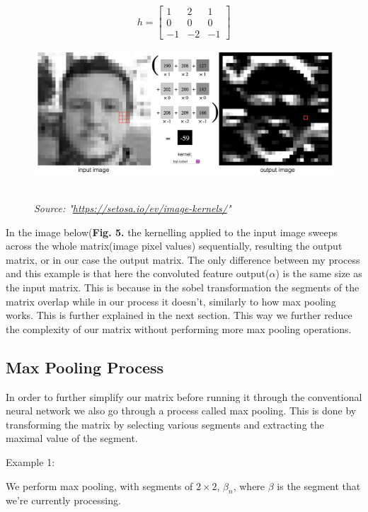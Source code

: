 \documentclass[9pt,onecolumn,oneside]{osajnl}
\begin{document}
    \[h =\begin{bmatrix}
1 & 2 & 1\\
0 & 0 & 0 \\
-1 & -2 & -1
\end{bmatrix} \]
\begin{figure}[h]
  \centering
  \begin{minipage}[b]{0.9\textwidth}
    \includegraphics[width=\textwidth]{sobel.png}
  \end{minipage}
  \\
  \textit{Source: "\url{https://setosa.io/ev/image-kernels/}"}
\end{figure}

	In the image below(\textbf{Fig. 5.} the kernelling applied to the input image sweeps across the whole matrix(image pixel values) sequentially, resulting the output matrix, or in our case the output matrix. The only difference between my process and this example is that here the convoluted feature output(\(\alpha\)) is the same size as the input matrix. This is because in the sobel transformation the segments of the matrix overlap while in our process it doesn't, similarly to how max pooling works. This is further explained in the next section. This way we further reduce the complexity of our matrix without performing more max pooling operations. 
  

\subsection{Max Pooling Process}

	In order to further simplify our matrix before running it through the conventional neural network we also go through a process called max pooling. This is done by transforming the matrix by selecting various segments and extracting the maximal value of the segment.

	Example 1:

	We perform max pooling, with segments of \(2\times2\), \(\beta_{n}\), where \(\beta\) is the segment that we're currently processing.
\end{document}
